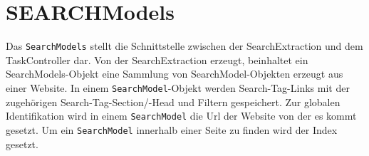 
\section{SEARCHModels}
Das \lstinline|SearchModels| stellt die Schnittstelle zwischen der SearchExtraction und dem TaskController dar. Von der SearchExtraction erzeugt, beinhaltet ein SearchModels-Objekt eine Sammlung von SearchModel-Objekten erzeugt aus einer Website. In einem \lstinline|SearchModel|-Objekt werden Search-Tag-Links mit der zugehörigen Search-Tag-Section/-Head und Filtern gespeichert.\newline
Zur globalen Identifikation wird in einem \lstinline|SearchModel| die Url der Website von der es kommt gesetzt. Um ein \lstinline|SearchModel| innerhalb einer Seite zu finden wird der Index gesetzt.

